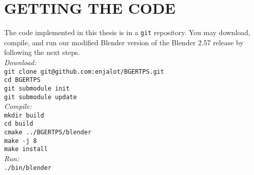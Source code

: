 \chapter{GETTING THE CODE}

The code implemented in this thesis is in a \texttt{git} repository. You may download, compile, and run our modified Blender version of the Blender 2.57 release by following the next steps. \\

\noindent
\textit{Download:} \\
\texttt{git clone git@github.com:enjalot/BGERTPS.git} \\
\texttt{cd BGERTPS} \\
\texttt{git submodule init} \\
\texttt{git submodule update} \\

\noindent
\textit{Compile:} \\
\texttt{mkdir build} \\
\texttt{cd build} \\
\texttt{cmake ../BGERTPS/blender} \\
\texttt{make -j 8} \\
\texttt{make install} \\

\noindent
\textit{Run:} \\
\texttt{./bin/blender} \\


